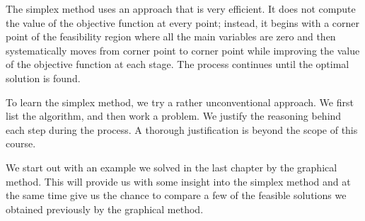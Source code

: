 The simplex method uses an approach that is very efficient. It does not compute the value of the objective function at every point; instead, it begins with a corner point of the feasibility region where all the main variables are zero and then systematically moves from corner point to corner point while improving the value of the objective function at each stage. The process continues until the optimal solution is found.

To learn the simplex method, we try a rather unconventional approach. We first list the algorithm, and then work a problem. We justify the reasoning behind each step during the process. A thorough justification is beyond the scope of this course.

We start out with an example we solved in the last chapter by the graphical method. This will provide us with some insight into the simplex method and at the same time give us the chance to compare a few of the feasible solutions we obtained previously by the graphical method.

